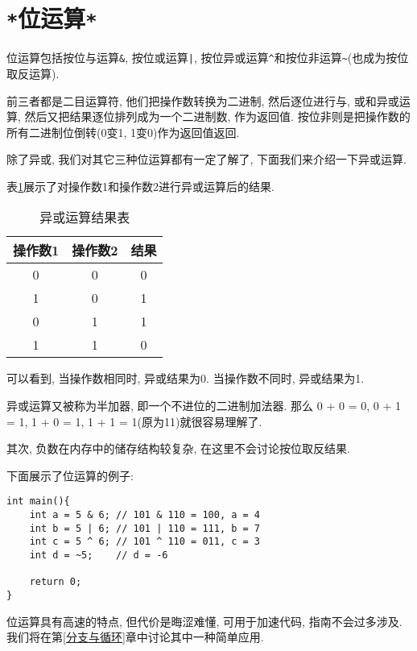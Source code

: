     \section{\texttt{*}位运算\texttt{*}} \label{位运算}
        位运算包括按位与运算\texttt{\&}, 按位或运算\texttt{|}, 按位异或运算\texttt{\^{}}和按位非运算\texttt{\~{}}(也成为按位取反运算).

        前三者都是二目运算符, 他们把操作数转换为二进制, 然后逐位进行与, 或和异或运算, 然后又把结果逐位排列成为一个二进制数, 作为返回值. 按位非则是把操作数的所有二进制位倒转(0变1, 1变0)作为返回值返回.

        除了异或, 我们对其它三种位运算都有一定了解了, 下面我们来介绍一下异或运算.

        表\ref{异或运算结果表}展示了对操作数1和操作数2进行异或运算后的结果.

        \begin{table}[htbp]
            \centering
            \renewcommand\arraystretch{1.5}
            \begin{tabular}{c c|c}
                操作数1 & 操作数2 & 结果 \\
                \hline
                0       & 0      & 0    \\
                1       & 0      & 1    \\
                0       & 1      & 1    \\
                1       & 1      & 0    \\
            \end{tabular}
            \caption{异或运算结果表} \label{异或运算结果表}
        \end{table}

        可以看到, 当操作数相同时, 异或结果为0. 当操作数不同时, 异或结果为1.

        异或运算又被称为半加器, 即一个不进位的二进制加法器. 那么 0 + 0 = 0, 0 + 1 = 1, 1 + 0 = 1, 1 + 1 = 1(原为11)就很容易理解了.

        其次, 负数在内存中的储存结构较复杂, 在这里不会讨论按位取反结果.

        下面展示了位运算的例子:
\begin{lstlisting}
int main(){
    int a = 5 & 6; // 101 & 110 = 100, a = 4
    int b = 5 | 6; // 101 | 110 = 111, b = 7
    int c = 5 ^ 6; // 101 ^ 110 = 011, c = 3
    int d = ~5;    // d = -6

    return 0;
}
\end{lstlisting}

        位运算具有高速的特点, 但代价是晦涩难懂, 可用于加速代码, 指南不会过多涉及. 我们将在第\ref{分支与循环}章中讨论其中一种简单应用.

